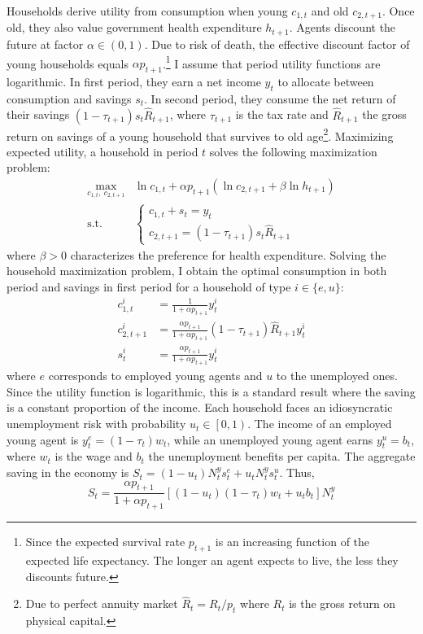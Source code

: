 Households derive utility from consumption when young $c_{1,t}$ and old $c_{2,t+1}$. Once old, they also value government health expenditure $h_{t+1}$. Agents discount the future at factor $\alpha \in \left(0,1\right)$. Due to risk of death, the effective discount factor of young households equals $\alpha p_{t+1}$.\footnote{Since the expected survival rate $p_{t+1}$ is an increasing function of the expected life expectancy. The longer an agent expects to live, the less they discounts future.} I assume that period utility functions are logarithmic. In first period, they earn a net income $y_t$ to allocate between consumption and savings $s_t$. In second period, they consume the net return of their savings $(1-\tau_{t+1}) s_t \hat{R}_{t+1}$, where $\tau_{t+1}$ is the tax rate and $\hat{R}_{t+1}$ the gross return on savings of a young household that survives to old age\footnote{Due to perfect annuity market $\hat{R}_t = R_t/p_t$ where $R_t$ is the gross return on physical capital.}. Maximizing expected utility, a household in period $t$ solves the following maximization problem:
	\begin{align*}
		\max_{c_{1,t},~c_{2,t+1}} &\ln c_{1,t} + \alpha p_{t+1}\left( \ln c_{2,t+1} + \beta \ln h_{t+1} \right)\\
		\text{s.t.} ~~ & \begin{cases}
		c_{1,t} + s_t = y_t \\
		c_{2,t+1} = (1-\tau_{t+1}) s_t \hat{R}_{t+1}
		\end{cases}
	\end{align*}
where $\beta>0$ characterizes the preference for health expenditure. Solving the household maximization problem, I obtain the optimal consumption in both period and savings in first period for a household of type $i \in \lbrace e, u \rbrace$:
	\begin{align*}
		c^i_{1,t} &= \frac{1}{1+\alpha p_{t+1}} y^i_{t} \\
		c^i_{2,t+1} &= \frac{\alpha p_{t+1}}{1+\alpha p_{t+1}}(1-\tau_{t+1})\hat{R}_{t+1}y^i_{t} \\
		s^i_t &= \frac{\alpha p_{t+1}}{1+\alpha p_{t+1}} y^i_t
	\end{align*}
where $e$ corresponds to employed young agents and $u$ to the unemployed ones.
Since the utility function is logarithmic, this is a standard result where the saving is a constant proportion of the income.
Each household faces an idiosyncratic unemployment risk with probability $u_t \in \left[0,1\right)$. The income of an employed young agent is $y^e_t = (1-\tau_t)w_t$, while an unemployed young agent earns $y^u_t = b_t$, where $w_t$ is the wage and $b_t$ the unemployment benefits per capita. The aggregate saving in the economy is $S_t = (1-u_t) N_t^y s^e_t + u_t N_t^y s^u_t$. Thus,
	\begin{equation}\label{eq:agg_saving}
		S_t = \frac{\alpha p_{t+1}}{1+\alpha p_{t+1}}\left[ (1-u_t)(1-\tau_t)w_t + u_t b_t \right] N_t^y
	\end{equation}
	
